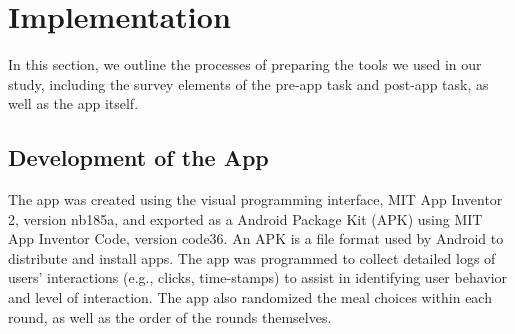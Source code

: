 \vspace{-5pt}
\section{Implementation}
In this section, we outline the processes of preparing the tools we used in our study, including the survey elements of the pre-app task and post-app task, as well as the app itself.
\vspace{-5pt}
\subsection{Development of the App}
The app was created using the visual programming interface, MIT App Inventor 2, version nb185a, and exported as a Android Package Kit (APK) using MIT App Inventor Code, version code36. An APK is a file format used by Android to distribute and install apps. The app was programmed to collect detailed logs of users' interactions (e.g., clicks, time-stamps) to assist in identifying user behavior and level of interaction. 
The app also randomized the meal choices within each round, as well as the order of the rounds themselves.

